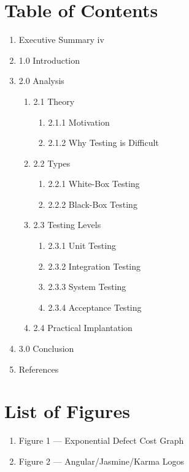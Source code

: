 \documentclass[12pt]{report}
\begin{document}
\newpage\thispagestyle{fancy}\sectionfont{\scshape}
\section*{Table of Contents}
\normalsize
\begin{enumerate}[label={},leftmargin=*,labelsep=2ex]
	\item Executive Summary \dotfill iv
    \item 1.0 Introduction 
    \item 2.0 Analysis 
    \begin{enumerate}[label*={},leftmargin=*,labelsep=2ex]
    	\item 2.1 Theory 
      	\begin{enumerate}[label*={},leftmargin=*,labelsep=2ex]
        	\item 2.1.1 Motivation 
        	\item 2.1.2 Why Testing is Difficult 
      	\end{enumerate}
      	\item 2.2 Types 
      	\begin{enumerate}[label*={},leftmargin=*,labelsep=2ex]
        	\item 2.2.1 White-Box Testing 
        	\item 2.2.2 Black-Box Testing 
      	\end{enumerate}
      	\item 2.3 Testing Levels 
      	\begin{enumerate}[label*={},leftmargin=*,labelsep=2ex]
        	\item 2.3.1 Unit Testing 
        	\item 2.3.2 Integration Testing 
        	\item 2.3.3 System Testing 
        	\item 2.3.4 Acceptance Testing 
      	\end{enumerate}
      	\item 2.4 Practical Implantation 
    \end{enumerate}
    \item 3.0 Conclusion 
    \item References 
\end{enumerate}

\newpage\thispagestyle{fancy}\sectionfont{\scshape}
\section*{List of Figures}
\normalsize{}
\begin{enumerate}[label*={},leftmargin=*,labelsep=2ex,ref=\arabic*]
    \item Figure 1 --- Exponential Defect Cost Graph 
    \item Figure 2 --- Angular/Jasmine/Karma Logos 

\end{enumerate}
\end{document}
